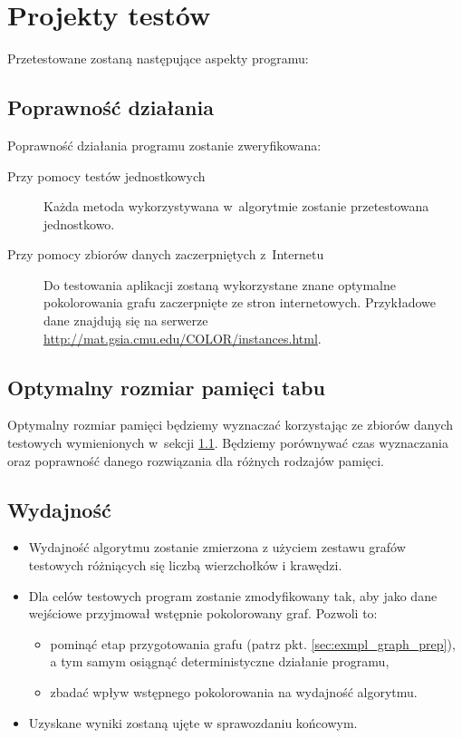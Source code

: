 \section{Projekty testów}
Przetestowane zostaną następujące aspekty programu:

\subsection{Poprawność działania}
\label{sec:algorithm_correctness}
Poprawność działania programu zostanie zweryfikowana:

\begin{description}
 \item [Przy pomocy testów jednostkowych] Każda metoda wykorzystywana w~algorytmie zostanie przetestowana jednostkowo.
 \item [Przy pomocy zbiorów danych zaczerpniętych z~Internetu] Do testowania aplikacji zostaną wykorzystane znane optymalne pokolorowania grafu zaczerpnięte ze stron internetowych. Przykładowe dane znajdują się na serwerze \url{http://mat.gsia.cmu.edu/COLOR/instances.html}.
\end{description}

\subsection{Optymalny rozmiar pamięci tabu}
Optymalny rozmiar pamięci będziemy wyznaczać korzystając ze zbiorów danych testowych wymienionych w~sekcji \ref{sec:algorithm_correctness}. Będziemy porównywać czas wyznaczania oraz poprawność danego rozwiązania dla różnych rodzajów pamięci. 

\subsection{Wydajność}
\begin{itemize}
 \item Wydajność algorytmu zostanie zmierzona z użyciem zestawu grafów testowych różniących się liczbą wierzchołków i krawędzi.
 \item Dla celów testowych program zostanie zmodyfikowany tak, aby jako dane wejściowe przyjmował wstępnie pokolorowany graf.
  Pozwoli to:
  \begin{itemize}
   \item pominąć etap przygotowania grafu (patrz pkt. \ref{sec:exmpl_graph_prep}), a tym samym osiągnąć deterministyczne działanie programu,
   \item zbadać wpływ wstępnego pokolorowania na wydajność algorytmu.
  \end{itemize}
 \item Uzyskane wyniki zostaną ujęte w sprawozdaniu końcowym.
\end{itemize}
